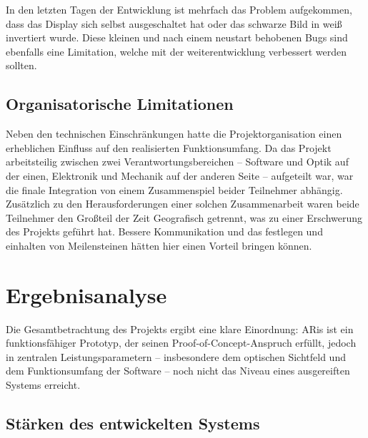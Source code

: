 In den letzten Tagen der Entwicklung ist mehrfach das Problem aufgekommen, dass das Display sich selbst ausgeschaltet hat oder das schwarze Bild in weiß invertiert wurde. Diese kleinen und nach einem neustart behobenen Bugs sind ebenfalls eine Limitation, welche mit der weiterentwicklung verbessert werden sollten.

\subsection{Organisatorische Limitationen}
\label{subsec:organisatorischeLimitationen}

Neben den technischen Einschränkungen hatte die Projektorganisation
einen erheblichen Einfluss auf den realisierten Funktionsumfang.
Da das Projekt arbeitsteilig zwischen zwei Verantwortungsbereichen
-- Software und Optik auf der einen, Elektronik und Mechanik auf der anderen Seite --
aufgeteilt war, war die finale Integration von einem Zusammenspiel beider Teilnehmer abhängig. Zusätzlich zu den Herausforderungen einer solchen Zusammenarbeit waren beide Teilnehmer den Großteil der Zeit Geografisch getrennt, was zu einer Erschwerung des Projekts geführt hat. Bessere Kommunikation und das festlegen und einhalten von Meilensteinen hätten hier einen Vorteil bringen können.

\newpage
\section{Ergebnisanalyse}
\label{sec:Ergebnisanalyse}

Die Gesamtbetrachtung des Projekts ergibt eine klare Einordnung:
ARis ist ein funktionsfähiger Prototyp, der seinen Proof-of-Concept-Anspruch
erfüllt, jedoch in zentralen Leistungsparametern -- insbesondere dem optischen
Sichtfeld und dem Funktionsumfang der Software -- noch nicht das Niveau
eines ausgereiften Systems erreicht.

\subsection{Stärken des entwickelten Systems}
\label{subsec:staerken}

